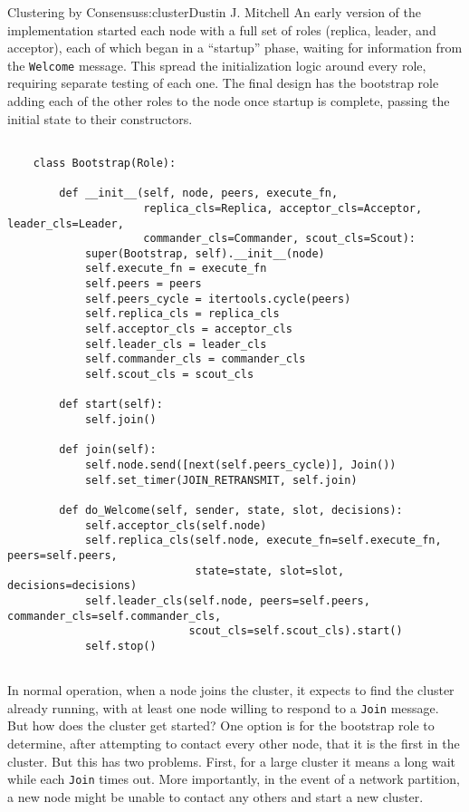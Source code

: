 \begin{aosachapter}{Clustering by Consensus}{s:cluster}{Dustin J. Mitchell}
An early version of the implementation started each node with a full set
of roles (replica, leader, and acceptor), each of which began in a
``startup'' phase, waiting for information from the \texttt{Welcome}
message. This spread the initialization logic around every role,
requiring separate testing of each one. The final design has the
bootstrap role adding each of the other roles to the node once startup
is complete, passing the initial state to their constructors.

\begin{verbatim}

    class Bootstrap(Role):
    
        def __init__(self, node, peers, execute_fn,
                     replica_cls=Replica, acceptor_cls=Acceptor, leader_cls=Leader,
                     commander_cls=Commander, scout_cls=Scout):
            super(Bootstrap, self).__init__(node)
            self.execute_fn = execute_fn
            self.peers = peers
            self.peers_cycle = itertools.cycle(peers)
            self.replica_cls = replica_cls
            self.acceptor_cls = acceptor_cls
            self.leader_cls = leader_cls
            self.commander_cls = commander_cls
            self.scout_cls = scout_cls
    
        def start(self):
            self.join()
    
        def join(self):
            self.node.send([next(self.peers_cycle)], Join())
            self.set_timer(JOIN_RETRANSMIT, self.join)
    
        def do_Welcome(self, sender, state, slot, decisions):
            self.acceptor_cls(self.node)
            self.replica_cls(self.node, execute_fn=self.execute_fn, peers=self.peers,
                             state=state, slot=slot, decisions=decisions)
            self.leader_cls(self.node, peers=self.peers, commander_cls=self.commander_cls,
                            scout_cls=self.scout_cls).start()
            self.stop()
    
\end{verbatim}

\label{seed}

In normal operation, when a node joins the cluster, it expects to find
the cluster already running, with at least one node willing to respond
to a \texttt{Join} message. But how does the cluster get started? One
option is for the bootstrap role to determine, after attempting to
contact every other node, that it is the first in the cluster. But this
has two problems. First, for a large cluster it means a long wait while
each \texttt{Join} times out. More importantly, in the event of a
network partition, a new node might be unable to contact any others and
start a new cluster.


\end{aosachapter}
